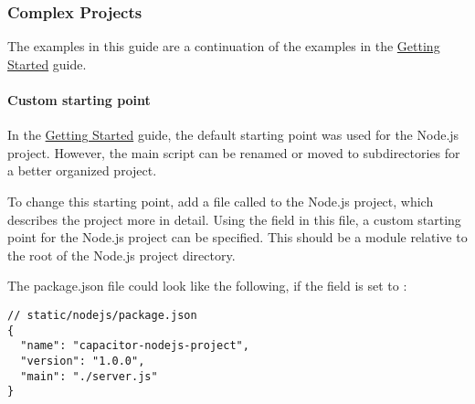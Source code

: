



\subsubsection{Complex Projects}
\label{sec:Capacitor-NodeJS:ComplexProjects}

The examples in this guide are a continuation of the examples in the \hyperref[sec:Capacitor-NodeJS:GettingStarted]{Getting Started} guide.

\paragraph{Custom starting point}
\label{sec:Capacitor-NodeJS:CustomStartingPoint}

In the \hyperref[sec:Capacitor-NodeJS:GettingStarted]{Getting Started} guide, the default starting point  was used for the Node.js project.
However, the main script can be renamed or moved to subdirectories for a better organized project.

To change this starting point, add a file called  to the Node.js project, which describes the project more in detail.
Using the  field in this file, a custom starting point for the Node.js project can be specified.
This should be a module relative to the root of the Node.js project directory. \cite{npm}

The package.json file could look like the following, if the  field is set to :

\begin{verbatim}
// static/nodejs/package.json
{
  "name": "capacitor-nodejs-project",
  "version": "1.0.0",
  "main": "./server.js"
}
\end{verbatim}

